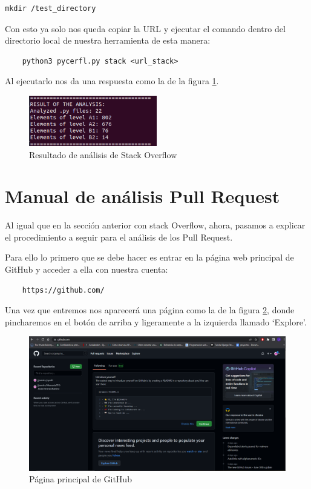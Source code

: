 \documentclass[a4paper, 12pt]{book}
\begin{document}
\begin{verbatim}
mkdir /test_directory
\end{verbatim}

Con esto ya solo nos queda copiar la URL y ejecutar el comando dentro del directorio local de nuestra herramienta de esta manera:

\begin{verbatim}
	python3 pycerfl.py stack <url_stack>
\end{verbatim}

Al ejecutarlo nos da una respuesta como la de la figura \ref{figura:stack4}.

\begin{figure}
	\centering
    \includegraphics[width=0.5\textwidth]{img/stack4}
    \caption{Resultado de análisis de Stack Overflow}
    \label{figura:stack4}
\end{figure}

\section{Manual de análisis Pull Request}

Al igual que en la sección anterior con stack Overflow, ahora, pasamos a explicar el procedimiento a seguir para el análisis de los Pull Request.

Para ello lo primero que se debe hacer es entrar en la página web principal de GitHub y acceder a ella con nuestra cuenta:

\begin{verbatim}
	https://github.com/
\end{verbatim}

Una vez que entremos nos aparecerá una página como la de la figura \ref{figura:git1}, donde pincharemos en el botón de arriba y ligeramente a la izquierda llamado `Explore'.

\begin{figure}
    \includegraphics[bb=0 0 800 600, width=12cm, keepaspectratio]{img/git1}
    \caption{Página principal de GitHub}
    \label{figura:git1}
 \end{figure}
 
\end{document}

